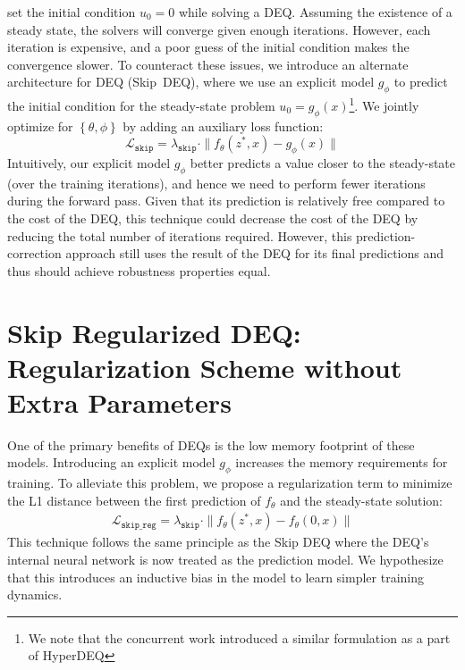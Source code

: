 \citet{bai_deep_2019, bai_multiscale_2020} set the initial condition $u_0 = 0$ while solving a DEQ. Assuming the existence of a steady state, the solvers will converge given enough iterations. However, each iteration is expensive, and a poor guess of the initial condition makes the convergence slower. To counteract these issues, we introduce an alternate architecture for DEQ (Skip~DEQ), where we use an explicit model $g_\phi$ to predict the initial condition for the steady-state problem $u_0 = g_\phi(x)$\footnote{We note that the concurrent work \citet{bai2021neural} introduced a similar formulation as a part of HyperDEQ}. We jointly optimize for $\left\{\theta, \phi\right\}$ by adding an auxiliary loss function:
%
\begin{equation}
    \mathcal{L}_{\texttt{skip}} = \lambda_{\texttt{skip}} \cdot \| f_\theta(z^*, x) - g_\phi(x) \|
\end{equation}
%
Intuitively, our explicit model $g_\phi$ better predicts a value closer to the steady-state (over the training iterations), and hence we need to perform fewer iterations during the forward pass. Given that its prediction is relatively free compared to the cost of the DEQ, this technique could decrease the cost of the DEQ by reducing the total number of iterations required. However, this prediction-correction approach still uses the result of the DEQ for its final predictions and thus should achieve robustness properties equal.

\section{Skip Regularized DEQ: Regularization Scheme without Extra Parameters}
\label{sec:skip_reg_deq}

One of the primary benefits of DEQs is the low memory footprint of these models. Introducing an explicit model $g_\phi$ increases the memory requirements for training. To alleviate this problem, we propose a regularization term to minimize the L1 distance between the first prediction of $f_\theta$ and the steady-state solution:
%
\begin{align}
    \mathcal{L}_{\texttt{skip\_reg}} = \lambda_{\texttt{skip}} \cdot \| f_\theta(z^*, x) - f_\theta(0, x) \|
\end{align}
%
This technique follows the same principle as the Skip DEQ where the DEQ's internal neural network is now treated as the prediction model. We hypothesize that this introduces an inductive bias in the model to learn simpler training dynamics.

